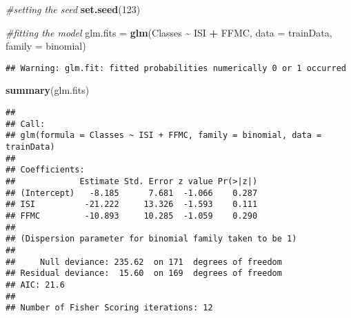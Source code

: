 \documentclass[
]{article}
\newenvironment{Shaded}{\begin{snugshade}}{\end{snugshade}}
\newcommand{\AttributeTok}[1]{\textcolor[rgb]{0.13,0.29,0.53}{#1}}
\newcommand{\CommentTok}[1]{\textcolor[rgb]{0.56,0.35,0.01}{\textit{#1}}}
\newcommand{\DecValTok}[1]{\textcolor[rgb]{0.00,0.00,0.81}{#1}}
\newcommand{\FunctionTok}[1]{\textcolor[rgb]{0.13,0.29,0.53}{\textbf{#1}}}
\newcommand{\NormalTok}[1]{#1}
\newcommand{\OtherTok}[1]{\textcolor[rgb]{0.56,0.35,0.01}{#1}}
\newcommand{\SpecialCharTok}[1]{\textcolor[rgb]{0.81,0.36,0.00}{\textbf{#1}}}
\newcommand{\StringTok}[1]{\textcolor[rgb]{0.31,0.60,0.02}{#1}}
\begin{document}
\begin{Shaded}
\begin{Highlighting}[]
\CommentTok{\#setting the seed}
\FunctionTok{set.seed}\NormalTok{(}\DecValTok{123}\NormalTok{)}

\CommentTok{\#fitting the model}
\NormalTok{glm.fits }\OtherTok{=} \FunctionTok{glm}\NormalTok{(Classes }\SpecialCharTok{\textasciitilde{}}\NormalTok{ ISI }\SpecialCharTok{+}\NormalTok{ FFMC, }\AttributeTok{data =}\NormalTok{ trainData, }\AttributeTok{family =}\NormalTok{ binomial)}
\end{Highlighting}
\end{Shaded}

\begin{verbatim}
## Warning: glm.fit: fitted probabilities numerically 0 or 1 occurred
\end{verbatim}

\begin{Shaded}
\begin{Highlighting}[]
\FunctionTok{summary}\NormalTok{(glm.fits)}
\end{Highlighting}
\end{Shaded}

\begin{verbatim}
## 
## Call:
## glm(formula = Classes ~ ISI + FFMC, family = binomial, data = trainData)
## 
## Coefficients:
##             Estimate Std. Error z value Pr(>|z|)
## (Intercept)   -8.185      7.681  -1.066    0.287
## ISI          -21.222     13.326  -1.593    0.111
## FFMC         -10.893     10.285  -1.059    0.290
## 
## (Dispersion parameter for binomial family taken to be 1)
## 
##     Null deviance: 235.62  on 171  degrees of freedom
## Residual deviance:  15.60  on 169  degrees of freedom
## AIC: 21.6
## 
## Number of Fisher Scoring iterations: 12
\end{verbatim}

\begin{Shaded}
\end{Shaded}
\end{document}
